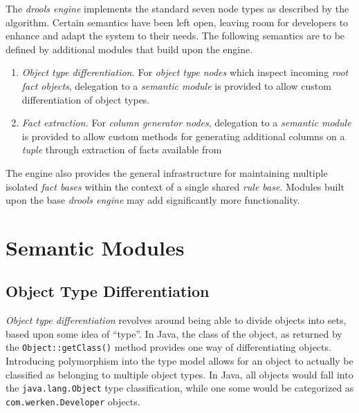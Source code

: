 \documentclass[10pt,letterpaper]{article}
\begin{document}
The \emph{drools engine} implements the standard seven node types
as described by the algorithm.  Certain semantics have been left
open, leaving room for developers to enhance and adapt the system
to their needs.  The following semantics are to be defined by
additional modules that build upon the engine.

\begin{enumerate}

	\item \emph{Object type differentiation.} For \emph{object type
	nodes} which inspect incoming \emph{root fact objects}, delegation
	to a \emph{semantic module} is provided to allow custom differentiation of object
	types.

	\item \emph{Fact extraction.} For \emph{column generator nodes},
	delegation to a \emph{semantic module} is provided to allow custom methods for
	generating additional columns on a \emph{tuple} through extraction
	of facts available from 

\end{enumerate}

The engine also provides the general infrastructure for maintaining
multiple isolated \emph{fact bases} within the context of a single
shared \emph{rule base}.  Modules built upon the base \emph{drools
engine} may add significantly more functionality.


\section{Semantic Modules}

\subsection{Object Type Differentiation}

\emph{Object type differentiation} revolves around being able
to divide objects into sets, based upon some idea of ``type''.  In 
Java, the class of the object, as returned by the
\verb|Object::getClass()| method provides one way of differentiating
objects.  Introducing polymorphism into the type model allows for
an object to actually be classified as belonging to multiple object
types.  In Java, all objects would fall into the
\verb|java.lang.Object| type classification, while one some would
be categorized as \verb|com.werken.Developer| objects.
\end{document}
